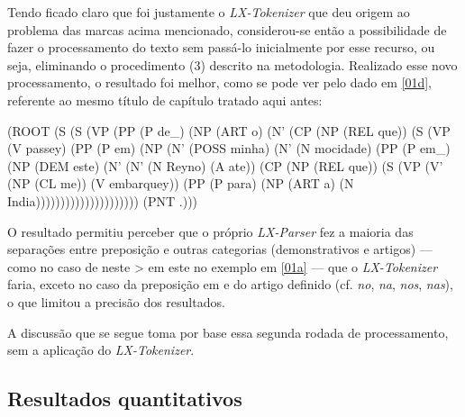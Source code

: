 \documentclass[portuguese]{textolivre}
\begin{document}
Tendo ficado claro que foi justamente o \textit{LX-Tokenizer} que deu origem ao problema das marcas acima mencionado, considerou-se então a possibilidade de fazer o processamento do texto sem passá-lo inicialmente por esse recurso, ou seja, eliminando o procedimento (3) descrito na metodologia. Realizado esse novo processamento, o resultado foi melhor, como se pode ver pelo dado em \ref{01d}, referente ao mesmo título de capítulo tratado aqui antes:

\begin{description}[topsep=10pt, parsep=2pt, itemindent=!]
\item[(01d)\label{01d}]
(ROOT (S (S (VP (PP (P de\_) (NP (ART o) (N' (CP (NP (REL que)) (S (VP (V passey) (PP (P em) (NP (N' (POSS minha) (N' (N mocidade) (PP (P em\_) (NP (DEM este) (N' (N' (N Reyno) (A ate)) (CP (NP (REL que)) (S (VP (V' (NP (CL me)) (V embarquey)) (PP (P para) (NP (ART a) (N India))))))))))))))))))))) (PNT .)))
\end{description}

O resultado permitiu perceber que o próprio \textit{LX-Parser} fez a maioria das separações entre preposição e outras categorias (demonstrativos e artigos) — como no caso de neste > em este no exemplo em \ref{01a} — que o \textit{LX-Tokenizer} faria, exceto no caso da preposição em e do artigo definido (cf. \textit{no}, \textit{na}, \textit{nos}, \textit{nas}), o que limitou a precisão dos resultados.

A discussão que se segue toma por base essa segunda rodada de processamento, sem a aplicação do \textit{LX-Tokenizer}.

\subsection{Resultados quantitativos}
\end{document}

